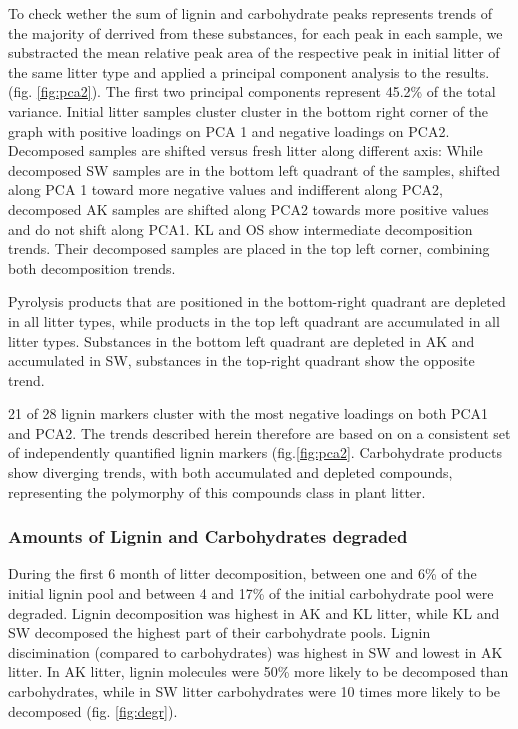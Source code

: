 \documentclass[authoryear,preprint,review,12pt]{elsarticle}
\begin{document}
To check wether the sum of lignin and carbohydrate peaks represents trends of the majority of derrived from these substances, for each peak in each sample, we substracted the mean relative peak area of the respective peak in initial litter of the same litter type and applied a principal component analysis to the results. (fig. \ref{fig:pca2}). The first two principal components represent 45.2\% of the total variance. Initial litter samples cluster cluster in the bottom right corner of the graph with positive loadings on PCA 1 and negative loadings on PCA2. Decomposed samples are shifted versus fresh litter along different axis: While decomposed SW samples are in the bottom left quadrant of the samples, shifted along PCA 1 toward more negative values and indifferent along PCA2, decomposed AK samples are shifted along PCA2 towards more positive values and do not shift along PCA1. KL and OS show intermediate decomposition trends. Their decomposed samples are placed in the top left corner, combining both decomposition trends.

Pyrolysis products that are positioned in the bottom-right quadrant are depleted in all litter types, while products in the top left quadrant are accumulated in all litter types. Substances in the bottom left quadrant are depleted in AK and accumulated in SW, substances in the top-right quadrant show the opposite trend.

21 of 28 lignin markers cluster with the most negative loadings on both PCA1 and PCA2. The trends described herein therefore are based on on a consistent set of independently quantified lignin  markers (fig.\ref{fig:pca2}. Carbohydrate products show diverging trends, with both accumulated and depleted compounds, representing the polymorphy of this compounds class in plant litter.

\subsubsection{Amounts of Lignin and Carbohydrates degraded}

During the first 6 month of litter decomposition, between one and 6\% of the initial lignin pool and between 4 and 17\% of the initial carbohydrate pool were degraded. Lignin decomposition was highest in AK and KL litter, while KL and SW decomposed the highest part of their carbohydrate pools. Lignin discimination (compared to carbohydrates) was highest in SW and lowest in AK litter. In AK litter, lignin molecules were 50\% more likely to be decomposed than carbohydrates, while in SW litter carbohydrates were 10 times more likely to be decomposed (fig. \ref{fig:degr}).
\end{document}

